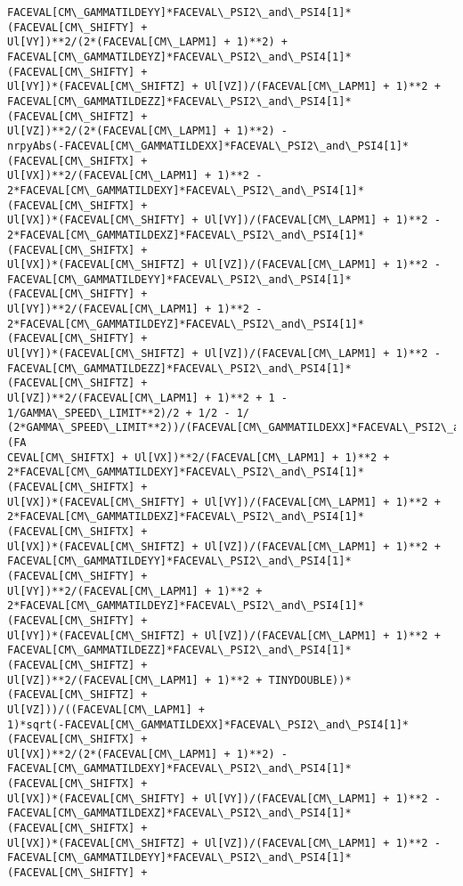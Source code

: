 \documentclass[landscape,letterpaper,10pt,english]{article}
\begin{document}
\begin{Verbatim}[commandchars=\\\{\}]
FACEVAL[CM\_GAMMATILDEYY]*FACEVAL\_PSI2\_and\_PSI4[1]*(FACEVAL[CM\_SHIFTY] +
Ul[VY])**2/(2*(FACEVAL[CM\_LAPM1] + 1)**2) +
FACEVAL[CM\_GAMMATILDEYZ]*FACEVAL\_PSI2\_and\_PSI4[1]*(FACEVAL[CM\_SHIFTY] +
Ul[VY])*(FACEVAL[CM\_SHIFTZ] + Ul[VZ])/(FACEVAL[CM\_LAPM1] + 1)**2 +
FACEVAL[CM\_GAMMATILDEZZ]*FACEVAL\_PSI2\_and\_PSI4[1]*(FACEVAL[CM\_SHIFTZ] +
Ul[VZ])**2/(2*(FACEVAL[CM\_LAPM1] + 1)**2) -
nrpyAbs(-FACEVAL[CM\_GAMMATILDEXX]*FACEVAL\_PSI2\_and\_PSI4[1]*(FACEVAL[CM\_SHIFTX] +
Ul[VX])**2/(FACEVAL[CM\_LAPM1] + 1)**2 -
2*FACEVAL[CM\_GAMMATILDEXY]*FACEVAL\_PSI2\_and\_PSI4[1]*(FACEVAL[CM\_SHIFTX] +
Ul[VX])*(FACEVAL[CM\_SHIFTY] + Ul[VY])/(FACEVAL[CM\_LAPM1] + 1)**2 -
2*FACEVAL[CM\_GAMMATILDEXZ]*FACEVAL\_PSI2\_and\_PSI4[1]*(FACEVAL[CM\_SHIFTX] +
Ul[VX])*(FACEVAL[CM\_SHIFTZ] + Ul[VZ])/(FACEVAL[CM\_LAPM1] + 1)**2 -
FACEVAL[CM\_GAMMATILDEYY]*FACEVAL\_PSI2\_and\_PSI4[1]*(FACEVAL[CM\_SHIFTY] +
Ul[VY])**2/(FACEVAL[CM\_LAPM1] + 1)**2 -
2*FACEVAL[CM\_GAMMATILDEYZ]*FACEVAL\_PSI2\_and\_PSI4[1]*(FACEVAL[CM\_SHIFTY] +
Ul[VY])*(FACEVAL[CM\_SHIFTZ] + Ul[VZ])/(FACEVAL[CM\_LAPM1] + 1)**2 -
FACEVAL[CM\_GAMMATILDEZZ]*FACEVAL\_PSI2\_and\_PSI4[1]*(FACEVAL[CM\_SHIFTZ] +
Ul[VZ])**2/(FACEVAL[CM\_LAPM1] + 1)**2 + 1 - 1/GAMMA\_SPEED\_LIMIT**2)/2 + 1/2 - 1/
(2*GAMMA\_SPEED\_LIMIT**2))/(FACEVAL[CM\_GAMMATILDEXX]*FACEVAL\_PSI2\_and\_PSI4[1]*(FA
CEVAL[CM\_SHIFTX] + Ul[VX])**2/(FACEVAL[CM\_LAPM1] + 1)**2 +
2*FACEVAL[CM\_GAMMATILDEXY]*FACEVAL\_PSI2\_and\_PSI4[1]*(FACEVAL[CM\_SHIFTX] +
Ul[VX])*(FACEVAL[CM\_SHIFTY] + Ul[VY])/(FACEVAL[CM\_LAPM1] + 1)**2 +
2*FACEVAL[CM\_GAMMATILDEXZ]*FACEVAL\_PSI2\_and\_PSI4[1]*(FACEVAL[CM\_SHIFTX] +
Ul[VX])*(FACEVAL[CM\_SHIFTZ] + Ul[VZ])/(FACEVAL[CM\_LAPM1] + 1)**2 +
FACEVAL[CM\_GAMMATILDEYY]*FACEVAL\_PSI2\_and\_PSI4[1]*(FACEVAL[CM\_SHIFTY] +
Ul[VY])**2/(FACEVAL[CM\_LAPM1] + 1)**2 +
2*FACEVAL[CM\_GAMMATILDEYZ]*FACEVAL\_PSI2\_and\_PSI4[1]*(FACEVAL[CM\_SHIFTY] +
Ul[VY])*(FACEVAL[CM\_SHIFTZ] + Ul[VZ])/(FACEVAL[CM\_LAPM1] + 1)**2 +
FACEVAL[CM\_GAMMATILDEZZ]*FACEVAL\_PSI2\_and\_PSI4[1]*(FACEVAL[CM\_SHIFTZ] +
Ul[VZ])**2/(FACEVAL[CM\_LAPM1] + 1)**2 + TINYDOUBLE))*(FACEVAL[CM\_SHIFTZ] +
Ul[VZ]))/((FACEVAL[CM\_LAPM1] +
1)*sqrt(-FACEVAL[CM\_GAMMATILDEXX]*FACEVAL\_PSI2\_and\_PSI4[1]*(FACEVAL[CM\_SHIFTX] +
Ul[VX])**2/(2*(FACEVAL[CM\_LAPM1] + 1)**2) -
FACEVAL[CM\_GAMMATILDEXY]*FACEVAL\_PSI2\_and\_PSI4[1]*(FACEVAL[CM\_SHIFTX] +
Ul[VX])*(FACEVAL[CM\_SHIFTY] + Ul[VY])/(FACEVAL[CM\_LAPM1] + 1)**2 -
FACEVAL[CM\_GAMMATILDEXZ]*FACEVAL\_PSI2\_and\_PSI4[1]*(FACEVAL[CM\_SHIFTX] +
Ul[VX])*(FACEVAL[CM\_SHIFTZ] + Ul[VZ])/(FACEVAL[CM\_LAPM1] + 1)**2 -
FACEVAL[CM\_GAMMATILDEYY]*FACEVAL\_PSI2\_and\_PSI4[1]*(FACEVAL[CM\_SHIFTY] +

\end{Verbatim}
\end{document}

